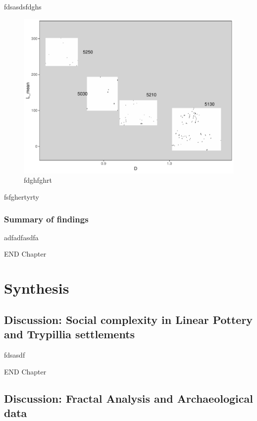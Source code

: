 \documentclass[
  12pt,
]{book}
\begin{document}
fdsasdsfdghs

\begin{figure}
\hypertarget{09-time}{%
\centering
\includegraphics{Results/fig09_time.pdf}
\caption{fdghfghrt}\label{09-time}
}
\end{figure}

fsfghertyrty

\hypertarget{summary-of-findings-1}{%
\section{Summary of findings}\label{summary-of-findings-1}}

adfadfasdfa

END Chapter

\hypertarget{part-synthesis}{%
\part{Synthesis}\label{part-synthesis}}

\hypertarget{disc-results}{%
\chapter{Discussion: Social complexity in Linear Pottery and Trypillia settlements}\label{disc-results}}

fdsasdf

END Chapter

\hypertarget{disc-methods}{%
\chapter{Discussion: Fractal Analysis and Archaeological data}\label{disc-methods}}
\end{document}
